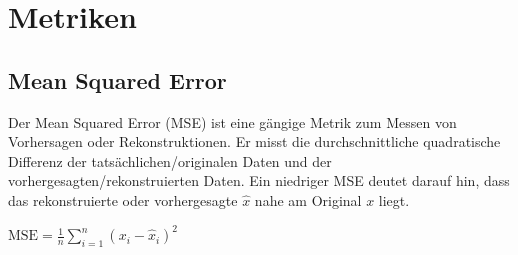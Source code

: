 \newpage
\section{Metriken}
    \subsection{Mean Squared Error}
            Der Mean Squared Error (MSE) ist eine gängige Metrik zum Messen von Vorhersagen oder Rekonstruktionen.
            Er misst die durchschnittliche quadratische Differenz der tatsächlichen/originalen Daten und der vorhergesagten/rekonstruierten Daten.
            Ein niedriger MSE deutet darauf hin, dass das rekonstruierte oder vorhergesagte $\hat{x}$ nahe am Original $x$ liegt.\bigskip
            \begin{center}
                $\text{MSE} = \frac{1}{n} \sum_{i=1}^{n} (x_i - \hat{x}_i)^2$
            \end{center}

